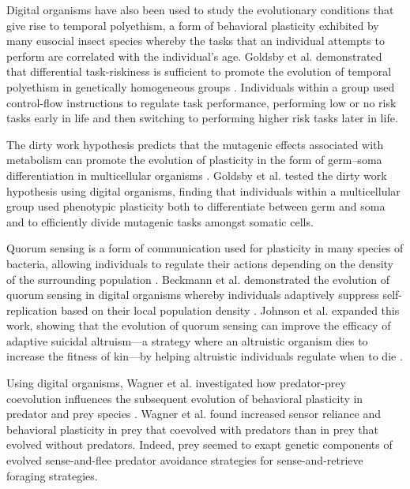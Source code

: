 Digital organisms have also been used to study the evolutionary conditions that give rise to temporal polyethism, a form of behavioral plasticity exhibited by many eusocial insect species whereby the tasks that an individual attempts to perform are correlated with the individual's age.
Goldsby et al. demonstrated that differential task-riskiness is sufficient to promote the evolution of temporal polyethism in genetically homogeneous groups \citep{goldsby_temporal_polyethism_2012}.
Individuals within a group used control-flow instructions to regulate task performance, performing low or no risk tasks early in life and then switching to performing higher risk tasks later in life. 

The dirty work hypothesis predicts that the mutagenic effects associated with metabolism can promote the evolution of plasticity in the form of germ--soma differentiation in multicellular organisms \citep{goldsby_evolutionary_2014}.
Goldsby et al. tested the dirty work hypothesis using digital organisms, finding that individuals within a multicellular group used phenotypic plasticity both to differentiate between germ and soma and to efficiently divide mutagenic tasks amongst somatic cells.

Quorum sensing is a form of communication used for plasticity in many species of bacteria, allowing individuals to regulate their actions depending on the density of the surrounding population \citep{miller_quorum_2001}. %
Beckmann et al. demonstrated the evolution of quorum sensing in digital organisms whereby individuals adaptively suppress self-replication based on their local population density \citep{beckmann_evolving_2009,beckmann_evolution_2012}.
Johnson et al. expanded this work, showing that the evolution of quorum sensing can improve the efficacy of adaptive suicidal altruism---a strategy where an altruistic organism dies to increase the fitness of kin---by helping altruistic individuals regulate when to die \citep{johnson_more_2014}.  

Using digital organisms, Wagner et al. investigated how predator-prey coevolution influences the subsequent evolution of behavioral plasticity in predator and prey species \citep{wagner_behavioral_2014,wagner_behavioral_2020}.
Wagner et al. found increased sensor reliance and behavioral plasticity in prey that coevolved with predators than in prey that evolved without predators. 
Indeed, prey seemed to exapt genetic components of evolved sense-and-flee predator avoidance strategies for sense-and-retrieve foraging strategies.

